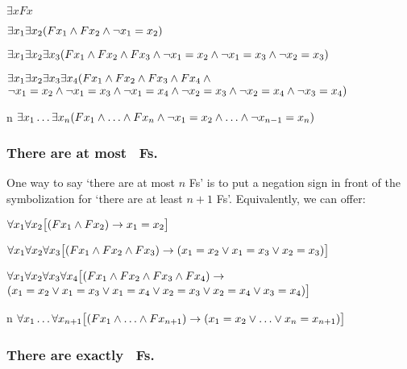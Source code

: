 \begin{ekey}
\item[\text{one}] $\exists xFx$
\item[\text{two}] $\exists x_1\exists x_2(Fx_1 \wedge Fx_2 \wedge \neg x_1  = x_2)$
\item[\text{three}] $\exists x_1\exists x_2\exists x_3(Fx_1 \wedge Fx_2 \wedge Fx_3 \wedge \neg x_1 = x_2 \wedge\neg x_1 = x_3 \wedge \neg x_2 = x_3)$
\item[\text{four}] $\exists x_1\exists x_2\exists x_3\exists x_4 (Fx_1 \wedge Fx_2 \wedge Fx_3 \wedge Fx_4 \wedge \phantom{x}$\\
\phantom{$\exists x_1\exists x_2$}$\neg x_1 = x_2 \wedge \neg x_1 = x_3 \wedge \neg x_1 = x_4 \wedge \neg x_2 = x_3 \wedge \neg x_2 = x_4 \wedge \neg x_3 = x_4)$
\item[n] $\exists x_1\ldots\exists x_n(Fx_1 \wedge\ldots\wedge Fx_n \wedge \neg x_1 = x_2 \wedge\ldots\wedge \neg x_{n-1} = x_n)$ 
\end{ekey}

\subsubsection*{There are at most \blank\ Fs.}
\label{summary.atmost}

One way to say `there are at most $n$ Fs' is to put a negation sign in front of the symbolization for `there are at least $n+1$ Fs'. Equivalently, we can offer:
\begin{ekey}
\item[\text{one}] $\forall x_1\forall x_2\bigl[(Fx_1 \wedge Fx_2) \rightarrow x_1=x_2\bigr]$
\item[\text{two}] $\forall x_1\forall x_2\forall x_3\bigl[(Fx_1 \wedge Fx_2 \wedge Fx_3) \rightarrow (x_1=x_2 \vee x_1=x_3 \vee x_2=x_3)\bigr]$
\item[\text{three}] $\forall x_1\forall x_2\forall x_3\forall x_4\bigl[(Fx_1 \wedge Fx_2 \wedge Fx_3 \wedge Fx_4) \rightarrow \phantom{.}$\\
\phantom{$\exists x_1 \exists x_2$}$(x_1=x_2 \vee x_1=x_3 \vee x_1=x_4 \vee x_2=x_3 \vee x_2=x_4 \vee x_3=x_4)\bigr]$
\item[n]$\forall x_1\ldots\forall x_{n+1}
\bigl[(Fx_1\wedge \ldots \wedge Fx_{n+1}) \rightarrow (x_1=x_2 \vee \ldots \vee x_n=x_{n+1})\bigr]$ 
\end{ekey}

\subsubsection*{There are exactly \blank\ Fs.}
\label{summary.exactly}

